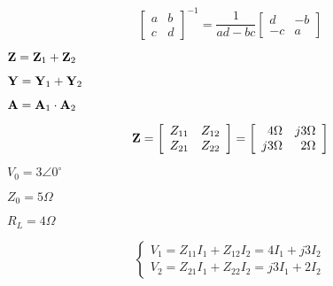 {\newpage\clearpage
{}%
\begin{displaymath}	 \left[ \begin{array}{rr} a & b \\c & d \end{array} \right]^{-1}
=\frac{1}{ad-bc}\left[ \begin{array}{rr} d & -b \\-c & a \end{array} \right]
\end{displaymath}%
\lthtmldisplayZ
\lthtmlcheckvsize\clearpage}

{\newpage\clearpage
{}%
${\bf Z}={\bf Z}_1+{\bf Z}_2$%
\lthtmlinlinemathZ
\lthtmlcheckvsize\clearpage}

{\newpage\clearpage
{}%
${\bf Y}={\bf Y}_1+{\bf Y}_2$%
\lthtmlinlinemathZ
\lthtmlcheckvsize\clearpage}

{\newpage\clearpage
{}%
${\bf A}={\bf A}_1 \cdot {\bf A}_2$%
\lthtmlinlinemathZ
\lthtmlcheckvsize\clearpage}

{\newpage\clearpage
{}%
\begin{displaymath} {\bf Z}=\left[\begin{array}{ll} Z_{11} & Z_{12} \\
	Z_{21} & Z_{22} \end{array}\right]
	=\left[\begin{array}{rr} 4\Omega & j3\Omega \\
	j3\Omega & 2\Omega \end{array}\right]	\end{displaymath}%
\lthtmldisplayZ
\lthtmlcheckvsize\clearpage}

{\newpage\clearpage
{}%
$V_0=3\angle 0^\circ$%
\lthtmlinlinemathZ
\lthtmlcheckvsize\clearpage}

{\newpage\clearpage
{}%
$Z_0=5\Omega$%
\lthtmlinlinemathZ
\lthtmlcheckvsize\clearpage}

{\newpage\clearpage
{}%
$R_L=4\Omega$%
\lthtmlinlinemathZ
\lthtmlcheckvsize\clearpage}

{\newpage\clearpage
{}%
\begin{displaymath} \left\{ \begin{array}{l} V_1=Z_{11}I_1+Z_{12}I_2= 4I_1+j3I_2 \\
	V_2=Z_{21}I_1+Z_{22}I_2=j3I_1+ 2I_2 \end{array} \right.	\end{displaymath}%
\lthtmldisplayZ
\lthtmlcheckvsize\clearpage}

